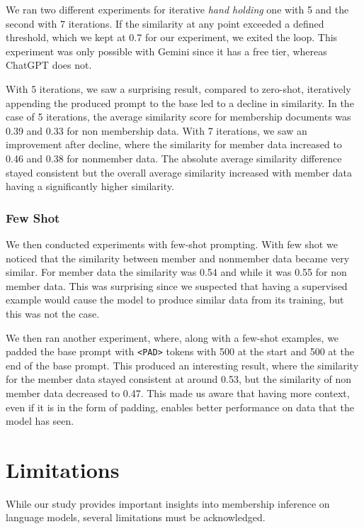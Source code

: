 \documentclass[sigconf]{acmart}
\begin{document}
We ran two different experiments for iterative \textit{hand holding} one with 5 and the second with 7 iterations. If the similarity at any point exceeded a defined threshold, which we kept at 0.7 for our experiment, we exited the loop. This experiment was only possible with Gemini since it has a free tier, whereas ChatGPT does not. 

With 5 iterations, we saw a surprising result, compared to zero-shot, iteratively appending the produced prompt to the base led to a decline in similarity. In the case of 5 iterations, the average similarity score for membership documents was 0.39 and 0.33 for non membership data. With 7 iterations, we saw an improvement after decline, where the similarity for member data increased to 0.46 and 0.38 for nonmember data. The absolute average similarity difference stayed consistent but the overall average similarity increased with member data having a significantly higher similarity. 

\subsubsection{Few Shot}

We then conducted experiments with few-shot prompting. With few shot we noticed that the similarity between member and nonmember data became very similar. For member data the similarity was 0.54 and while it was 0.55 for non member data. This was surprising since we suspected that having a supervised example would cause the model to produce similar data from its training, but this was not the case. 

We then ran another experiment, where, along with a few-shot examples, we padded the base prompt with \texttt{<PAD>} tokens with 500 at the start and 500 at the end of the base prompt. This produced an interesting result, where the similarity for the member data stayed consistent at around 0.53, but the similarity of non member data decreased to 0.47. This made us aware that having more context, even if it is in the form of padding, enables better performance on data that the model has seen. 


\section{Limitations}

While our study provides important insights into membership inference on language models, several limitations must be acknowledged.
\end{document}
